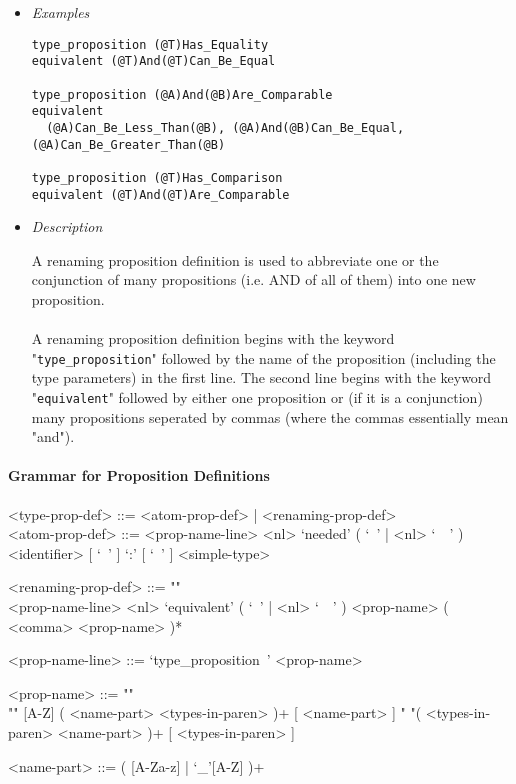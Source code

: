 \documentclass{article}
\begin{document}
\begin{itemize}
\item \textit{Examples}
\begin{verbatim}
type_proposition (@T)Has_Equality
equivalent (@T)And(@T)Can_Be_Equal

type_proposition (@A)And(@B)Are_Comparable
equivalent
  (@A)Can_Be_Less_Than(@B), (@A)And(@B)Can_Be_Equal, (@A)Can_Be_Greater_Than(@B)

type_proposition (@T)Has_Comparison
equivalent (@T)And(@T)Are_Comparable
\end{verbatim}

\item \textit{Description}

A renaming proposition definition is used to abbreviate one or the conjunction
of many propositions (i.e. AND of all of them) into one new proposition.
\\\\
A renaming proposition definition begins with the keyword
"\verb|type_proposition|" followed by the name of the proposition (including
the type parameters) in the first line. The second line begins with the keyword
"\verb|equivalent|" followed by either one proposition or (if it is a
conjunction) many propositions seperated by commas (where the commas
essentially mean "and").

\end{itemize}

\paragraph{Grammar for Proposition Definitions}

\begin{grammar}
<type-prop-def> ::= <atom-prop-def> | <renaming-prop-def>
\\

<atom-prop-def> ::=
<prop-name-line> <nl> `needed' ( `\ ' | <nl> `\ \ ' )
<identifier> [ `\ ' ] `:' [ `\ ' ] <simple-type>

<renaming-prop-def> ::= ""\\
<prop-name-line> <nl>
`equivalent' ( `\ ' | <nl> `\ \ ' ) <prop-name> ( <comma> <prop-name> )*

<prop-name-line> ::= `type_proposition\ ' <prop-name>

<prop-name> ::=  ""\\""
[A-Z] ( <name-part> <types-in-paren> )+ [ <name-part> ]
\alt " "( <types-in-paren> <name-part> )+ [ <types-in-paren> ]

<name-part> ::= ( [A-Za-z] | `_'[A-Z] )+
\end{grammar}
\end{document}
